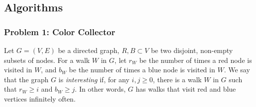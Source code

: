 \documentclass{article}
\begin{document}
\subsection{Algorithms}

\subsubsection{Problem 1: Color Collector}

Let \(G = (V,E)\) be a directed graph, \(R, B \subset V\) be two disjoint, non-empty subsets of nodes. For a walk \(W\) in \(G\), let \(r_W\) be the number of times a red node is visited in \(W\), and \(b_W\) be the number of times a blue node is visited in \(W\). We say that the graph \(G\) is \emph{interesting} if, for any \(i,j \geq 0\), there is a walk \(W\) in \(G\) such that \(r_W \geq i\) and \(b_W \geq j\). In other words, \(G\) has walks that visit red and blue vertices infinitely often.
\end{document}
